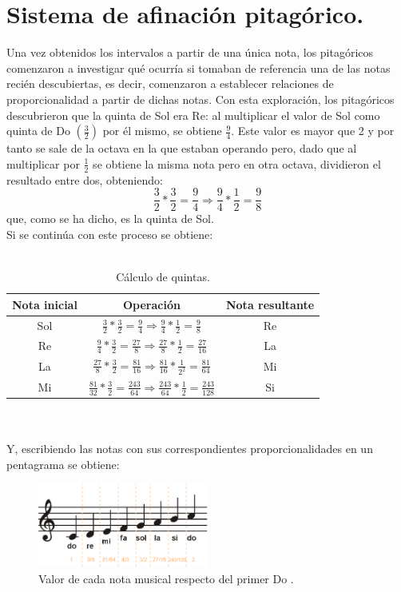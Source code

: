 \documentclass[a4paper, openright, 11pt, titlepage]{report}
\theoremstyle{definition}\newtheorem{defin}[propo]{Definition}
\theoremstyle{definition}\newtheorem{obser}[propo]{Remark}
\theoremstyle{definition}\newtheorem{ejem}[propo]{Ejemplo}
\theoremstyle{definition}\newtheorem{algoritmo}[propo]{Algoritmo}
\begin{document}
\section{Sistema de afinación pitagórico.}
Una vez obtenidos los intervalos a partir de una única nota, los pitagóricos comenzaron a investigar qué ocurría si tomaban de referencia una de las notas recién descubiertas, es decir, comenzaron a establecer relaciones de proporcionalidad a partir de dichas notas. Con esta exploración, los pitagóricos descubrieron que la quinta de Sol era Re: al multiplicar el valor de Sol como quinta de Do $(\frac{3}{2})$ por él mismo, se obtiene $\frac{9}{4}$. Este valor es mayor que 2 y por tanto se sale de la octava en la que estaban operando pero, dado que al multiplicar por $\frac{1}{2}$ se obtiene la misma nota pero en otra octava, dividieron el resultado entre dos, obteniendo: $$\frac{3}{2}*\frac{3}{2} = \frac{9}{4} \Longrightarrow \frac{9}{4}*\frac{1}{2} = \frac{9}{8}$$
que, como se ha dicho, es la quinta de Sol. \\
Si se continúa con este proceso se obtiene:\\\\
\begin{table}
\centering
\begin{tabular}{c|c|c}
\hline
     Nota inicial & Operación & Nota resultante \\
     \hline \hline
     Sol & $\frac{3}{2}*\frac{3}{2} = \frac{9}{4} \Longrightarrow \frac{9}{4}*\frac{1}{2} = \frac{9}{8}$ & Re \\
     Re & $\frac{9}{4}*\frac{3}{2} = \frac{27}{8} \Longrightarrow \frac{27}{8}*\frac{1}{2} = \frac{27}{16}$ & La \\
     La & $\frac{27}{8}*\frac{3}{2} = \frac{81}{16} \Longrightarrow \frac{81}{16}*\frac{1}{2^{2}} = \frac{81}{64}$ & Mi\\
     Mi & $\frac{81}{32}*\frac{3}{2} = \frac{243}{64} \Longrightarrow \frac{243}{64}*\frac{1}{2} = \frac{243}{128}$ & Si \\
     \hline
\end{tabular}
\caption{Cálculo de quintas.}
\end{table}
\\\\
Y, escribiendo las notas con sus correspondientes proporcionalidades en un pentagrama se obtiene:
\begin{figure}[H]
    \centering
    \includegraphics[width = 0.5\textwidth]{pentagrama.png}
    \caption{Valor de cada nota musical respecto del primer Do .}
\end{figure}
\end{document}

